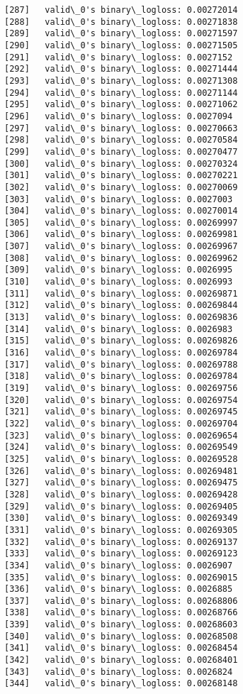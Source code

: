 \documentclass[11pt]{article}
\begin{document}
\begin{Verbatim}[commandchars=\\\{\}]
[287]	valid\_0's binary\_logloss: 0.00272014
[288]	valid\_0's binary\_logloss: 0.00271838
[289]	valid\_0's binary\_logloss: 0.00271597
[290]	valid\_0's binary\_logloss: 0.00271505
[291]	valid\_0's binary\_logloss: 0.0027152
[292]	valid\_0's binary\_logloss: 0.00271444
[293]	valid\_0's binary\_logloss: 0.00271308
[294]	valid\_0's binary\_logloss: 0.00271144
[295]	valid\_0's binary\_logloss: 0.00271062
[296]	valid\_0's binary\_logloss: 0.0027094
[297]	valid\_0's binary\_logloss: 0.00270663
[298]	valid\_0's binary\_logloss: 0.00270584
[299]	valid\_0's binary\_logloss: 0.00270477
[300]	valid\_0's binary\_logloss: 0.00270324
[301]	valid\_0's binary\_logloss: 0.00270221
[302]	valid\_0's binary\_logloss: 0.00270069
[303]	valid\_0's binary\_logloss: 0.0027003
[304]	valid\_0's binary\_logloss: 0.00270014
[305]	valid\_0's binary\_logloss: 0.00269997
[306]	valid\_0's binary\_logloss: 0.00269981
[307]	valid\_0's binary\_logloss: 0.00269967
[308]	valid\_0's binary\_logloss: 0.00269962
[309]	valid\_0's binary\_logloss: 0.0026995
[310]	valid\_0's binary\_logloss: 0.0026993
[311]	valid\_0's binary\_logloss: 0.00269871
[312]	valid\_0's binary\_logloss: 0.00269844
[313]	valid\_0's binary\_logloss: 0.00269836
[314]	valid\_0's binary\_logloss: 0.0026983
[315]	valid\_0's binary\_logloss: 0.00269826
[316]	valid\_0's binary\_logloss: 0.00269784
[317]	valid\_0's binary\_logloss: 0.00269788
[318]	valid\_0's binary\_logloss: 0.00269784
[319]	valid\_0's binary\_logloss: 0.00269756
[320]	valid\_0's binary\_logloss: 0.00269754
[321]	valid\_0's binary\_logloss: 0.00269745
[322]	valid\_0's binary\_logloss: 0.00269704
[323]	valid\_0's binary\_logloss: 0.00269654
[324]	valid\_0's binary\_logloss: 0.00269549
[325]	valid\_0's binary\_logloss: 0.00269528
[326]	valid\_0's binary\_logloss: 0.00269481
[327]	valid\_0's binary\_logloss: 0.00269475
[328]	valid\_0's binary\_logloss: 0.00269428
[329]	valid\_0's binary\_logloss: 0.00269405
[330]	valid\_0's binary\_logloss: 0.00269349
[331]	valid\_0's binary\_logloss: 0.00269305
[332]	valid\_0's binary\_logloss: 0.00269137
[333]	valid\_0's binary\_logloss: 0.00269123
[334]	valid\_0's binary\_logloss: 0.0026907
[335]	valid\_0's binary\_logloss: 0.00269015
[336]	valid\_0's binary\_logloss: 0.0026885
[337]	valid\_0's binary\_logloss: 0.00268806
[338]	valid\_0's binary\_logloss: 0.00268766
[339]	valid\_0's binary\_logloss: 0.00268603
[340]	valid\_0's binary\_logloss: 0.00268508
[341]	valid\_0's binary\_logloss: 0.00268454
[342]	valid\_0's binary\_logloss: 0.00268401
[343]	valid\_0's binary\_logloss: 0.0026824
[344]	valid\_0's binary\_logloss: 0.00268148

\end{Verbatim}
\end{document}
